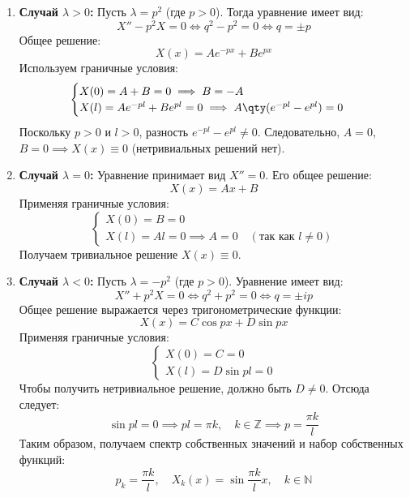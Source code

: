 \begin{enumerate}
	\item[1)] \textbf{Случай $\lambda > 0$:}
	Пусть $\lambda = p^2$ (где $p > 0$). Тогда уравнение имеет вид:
	\begin{equation}
		X'' - p^2 X = 0 \iff q^2 - p^2 = 0 \iff q = \pm p
	\end{equation}
	Общее решение:
	\begin{equation}
		X(x) = A e^{-px} + B e^{px}
	\end{equation}
	Используем граничные условия:
	\begin{equation}
		\begin{cases}
			X(0) = A + B = 0 \implies B = -A \\
			X(l) = A e^{-pl} + B e^{pl} = 0 \implies A \qty( e^{-pl} - e^{pl} ) = 0
		\end{cases}
	\end{equation}
	Поскольку $p > 0$ и $l > 0$, разность $e^{-pl} - e^{pl} \neq 0$. Следовательно, $A = 0$, $B = 0 \implies X(x) \equiv 0$ (нетривиальных решений нет).
	
	\item[2)] \textbf{Случай $\lambda = 0$:}
	Уравнение принимает вид $X'' = 0$. Его общее решение:
	\begin{equation}
		X(x) = Ax + B
	\end{equation}
	Применяя граничные условия:
	\begin{equation}
		\begin{cases}
			X(0) = B = 0 \\
			X(l) = Al = 0 \implies A = 0 \quad (\text{так как } l \neq 0)
		\end{cases}
	\end{equation}
	Получаем тривиальное решение $X(x) \equiv 0$.
	
	\item[3)] \textbf{Случай $\lambda < 0$:}
	Пусть $\lambda = -p^2$ (где $p > 0$). Уравнение имеет вид:
	\begin{equation}
		X'' + p^2 X = 0 \iff q^2 + p^2 = 0 \iff q = \pm ip
	\end{equation}
	Общее решение выражается через тригонометрические функции:
	\begin{equation}
		X(x) = C \cos px + D \sin px
	\end{equation}
	Применяя граничные условия:
	\begin{equation}
		\begin{cases}
			X(0) = C = 0 \\
			X(l) = D \sin pl = 0
		\end{cases}
	\end{equation}
	Чтобы получить нетривиальное решение, должно быть $D \neq 0$. Отсюда следует:
	\begin{equation}
		\sin pl = 0 \implies pl = \pi k, \quad k \in \mathbb{Z} \implies p = \frac{\pi k}{l}
	\end{equation}
	Таким образом, получаем спектр собственных значений и набор собственных функций:
	\begin{equation}
		p_k = \frac{\pi k}{l}, \quad X_k(x) = \sin \frac{\pi k}{l} x, \quad k \in \mathbb{N}
	\end{equation}
\end{enumerate}

